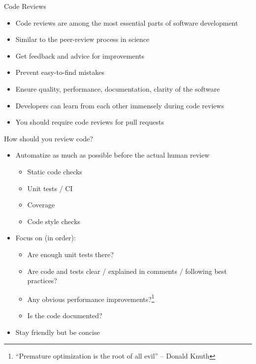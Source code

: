 \begin{frame}[c]{Code Reviews}
  \begin{itemize}
    \item Code reviews are among the most essential parts of software development
    \item Similar to the peer-review process in science
    \item Get feedback and advice for improvements
    \item Prevent easy-to-find mistakes
    \item Ensure quality, performance, documentation, clarity of the software
    \item Developers can learn from each other immensely during code reviews
    \item You should require code reviews for pull requests
  \end{itemize}
\end{frame}

\begin{frame}[c]{How should you review code?}
  \begin{itemize}
    \item Automatize as much as possible before the actual human review
      \begin{itemize}
        \item Static code checks
        \item Unit tests / CI
        \item Coverage
        \item Code style checks
      \end{itemize}
    \item Focus on (in order):
      \begin{itemize}
        \item[\color{positive}\faCheckSquare] Are enough unit tests there?
        \item[\color{positive}\faCheckSquare] Are code and tests clear / explained in comments / following best practices?
        \item[\color{positive}\faCheckSquare] Any obvious performance improvements?\footnote{\enquote{Premature optimization is the root of all evil} –  Donald Knuth}
        \item[\color{positive}\faCheckSquare] Is the code documented?
      \end{itemize}
    \item Stay friendly but be concise
  \end{itemize}
\end{frame}


